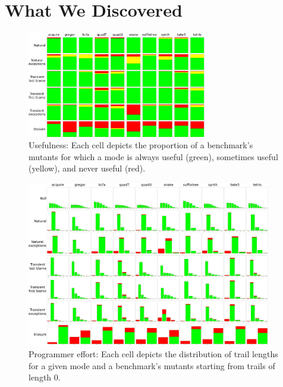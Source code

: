 \section{What We Discovered}

\begin{figure}
  \centering
  \includegraphics[width=0.7\textwidth]{./plots/usefulness-table}
  \caption{Usefulness: Each cell depicts the proportion of a benchmark's mutants for which a mode is always useful (green), sometimes useful (yellow), and never useful (red).}
  \label{fig:usefulness-table}
\end{figure}

\begin{figure}
  \centering
  \includegraphics[width=0.95\textwidth]{./plots/bt-lengths-table}
  \caption{Programmer effort: Each cell depicts the distribution of trail
  lengths for a given mode and a benchmark's mutants starting from trails
  of length 0.}
  \label{fig:effort-table}
\end{figure}

